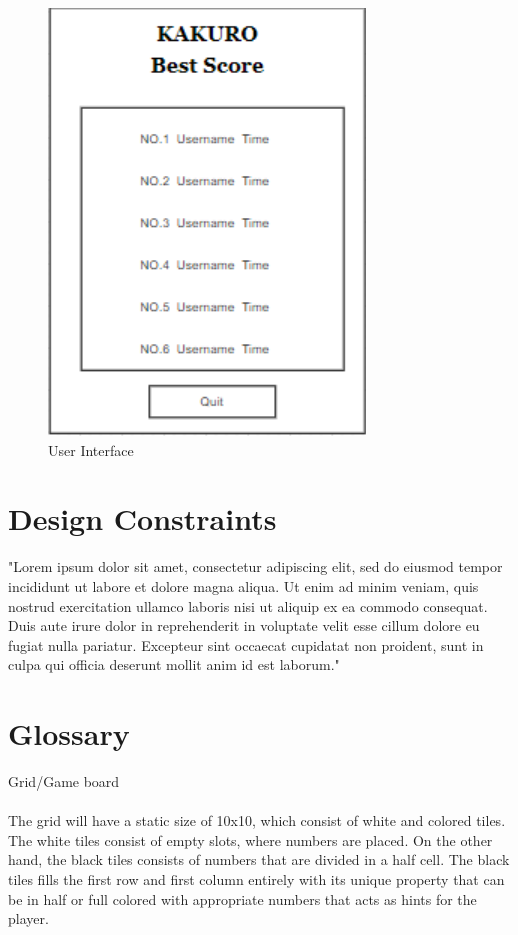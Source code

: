 \documentclass[12pt]{article}
\begin{document}
\begin{figure}[htbp]
          \includegraphics[scale=0.5]{iteration1/images/UI4.png}
    \caption{User Interface}
    \label{fig:UI}
\end{figure}

\section{Design Constraints}
"Lorem ipsum dolor sit amet, consectetur adipiscing elit, sed do eiusmod tempor incididunt ut labore et dolore magna aliqua. Ut enim ad minim veniam, quis nostrud exercitation ullamco laboris nisi ut aliquip ex ea commodo consequat. Duis aute irure dolor in reprehenderit in voluptate velit esse cillum dolore eu fugiat nulla pariatur. Excepteur sint occaecat cupidatat non proident, sunt in culpa qui officia deserunt mollit anim id est laborum."

\section{Glossary}



Grid/Game board\\\\
The grid will have a static size of 10x10, which consist of white and colored tiles. The white tiles consist of empty slots, where numbers are placed. On the other hand, the black tiles consists of numbers that are divided in a half cell. The black tiles fills the first row and first column entirely with its unique property that can be in half or full colored with appropriate numbers that acts as hints for the player.\\
\end{document}
